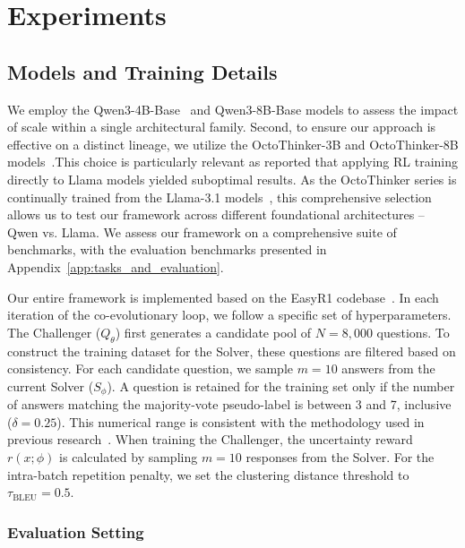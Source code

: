 \section{Experiments}
\label{sec:experiments}
\subsection{Models and Training Details}
We employ the Qwen3-4B-Base~\citep{Yang2025Qwen3TR} and Qwen3-8B-Base models to assess the impact of scale within a single architectural family. Second, to ensure our approach is effective on a distinct lineage, we utilize the OctoThinker-3B and OctoThinker-8B models~\citep{wang2025octothinker}.This choice is particularly relevant as \cite{wang2025octothinker} reported that applying RL training directly to Llama models yielded suboptimal results. As the OctoThinker series is continually trained from the Llama-3.1 models~\citep{Dubey2024TheL3}, this comprehensive selection allows us to test our framework across different foundational architectures -- Qwen vs. Llama. We assess our framework on a comprehensive suite of benchmarks, with the evaluation benchmarks presented in Appendix~\ref{app:tasks_and_evaluation}.

Our entire framework is implemented based on the EasyR1 codebase~\citep{zheng2025easyr1}. In each iteration of the \method{} co-evolutionary loop, we follow a specific set of hyperparameters. The Challenger ($Q_{\theta}$) first generates a candidate pool of $N=8,000$ questions. To construct the training dataset for the Solver, these questions are filtered based on consistency. For each candidate question, we sample $m=10$ answers from the current Solver ($S_{\phi}$). 
A question is retained for the training set only if the number of answers matching the majority-vote pseudo-label is between 3 and 7, inclusive ($\delta=0.25$). This numerical range is consistent with the methodology used in previous research~\citep{Zhang2025GRPOLEADAD,li2025semanticallyawarerewardsopenendedr1,Bercovich2025LlamaNemotronER}.
When training the Challenger, the uncertainty reward $r(x; \phi)$ is calculated by sampling $m=10$ responses from the Solver. For the intra-batch repetition penalty, we set the clustering distance threshold to $\tau_{\text{BLEU}} = 0.5$. 


\subsubsection{Evaluation Setting}

